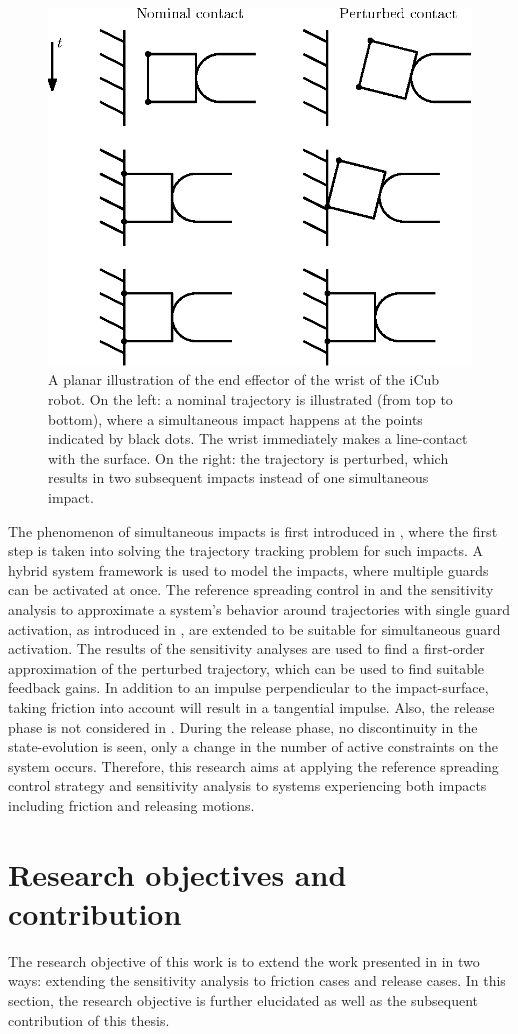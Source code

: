 \documentclass[../DC2017114Bouma.tex]{subfiles}
\begin{document}
\begin{figure}[hbt!]
\centering
\includegraphics[width=.45\textwidth]{simultaneous.eps}\caption{A planar illustration of the end effector of the wrist of the iCub robot. On the left: a nominal trajectory is illustrated (from top to bottom), where a simultaneous impact happens at the points indicated by black dots. The wrist immediately makes a line-contact with the surface. On the right: the trajectory is perturbed, which results in two subsequent impacts instead of one simultaneous impact.}\label{fig:simultaneous}
\end{figure}

The phenomenon of simultaneous impacts is first introduced in \cite{Chen2018a}, where the first step is taken into solving the trajectory tracking problem for such impacts. A hybrid system framework is used to model the impacts, where multiple guards can be activated at once. The reference spreading control in \cite{Rijnen2016,Rijnen2017} and the sensitivity analysis to approximate a system's behavior around trajectories with single guard activation, as introduced in \cite{Saccon2014}, are extended to be suitable for simultaneous guard activation. The results of the sensitivity analyses are used to find a first-order approximation of the perturbed trajectory, which can be used to find suitable feedback gains. In addition to an impulse perpendicular to the impact-surface, taking friction into account will result in a tangential impulse. Also, the release phase is not considered in \cite{Chen2018a}. During the release phase, no discontinuity in the state-evolution is seen, only a change in the number of active constraints on the system occurs. Therefore, this research aims at applying the reference spreading control strategy and sensitivity analysis to systems experiencing both impacts including friction and releasing motions.

\section{Research objectives and contribution}\label{sec:1resobj}
The research objective of this work is to extend the work presented in \cite{Rijnen2018a} in two ways: extending the sensitivity analysis to friction cases and release cases. In this section, the research objective is further elucidated as well as the subsequent contribution of this thesis.
\end{document}
